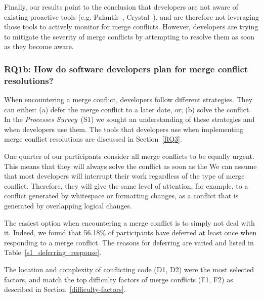 Finally, our results point to the conclusion that developers are not aware of existing proactive tools (e.g. Palant\'{i}r~\cite{sarma_palantir:_2003}, Crystal~\cite{Brun2011}), and are therefore not leveraging those tools to actively monitor for merge conflicts.
However, developers are trying to mitigate the severity of merge conflicts by attempting to resolve them as soon as they become aware.

\subsubsection{\textbf{RQ1b:} How do software developers \textbf{plan} for merge conflict resolutions?}\label{RQ1b}

When encountering a merge conflict, developers follow different strategies.
They can either: (a) defer the merge conflict to a later date, or; (b) solve the conflict.
In the \textit{Processes Survey}~(S1) we sought an understanding of these strategies and when developers use them.
The tools that developers use when implementing merge conflict resolutions are discussed in Section~\ref{RQ3}.


One quarter of our participants consider all merge conflicts to be equally urgent.
This means that they will always solve the conflict as soon as the 
We can assume that most developers will interrupt their work regardless of the type of merge conflict.
Therefore, they will give the same level of attention, for example, to a conflict generated by whitespace or formatting changes, as a conflict that is generated by overlapping logical changes. 

The easiest option when encountering a merge conflict is to simply not deal with it.
Indeed, we found that 56.18\% of participants have deferred at least once when responding to a merge conflict.
The reasons for deferring are varied and listed in Table~\ref{s1_deferring_response}.

The location and complexity of conflicting code (D1, D2) were the most selected factors, and match the top difficulty factors of merge conflicts (F1, F2) as described in Section~\ref{difficulty-factors}.

